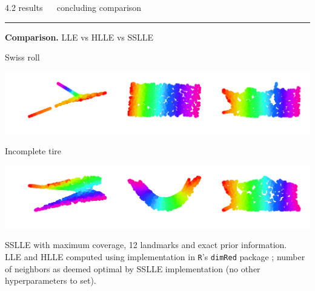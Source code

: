 \documentclass[11pt, compress, t, notes = noshow, xcolor = table, 
aspectratio = 1610]{beamer}
\begin{document}
\LARGE
\begin{frame}{\textcolor{gray!90}{4.2 results} ~~ concluding comparison}
\normalsize
\vspace{-0.5cm}
\noindent \textcolor{gray!90}{\rule{\textwidth}{1pt}}
\smallskip

\textbf{Comparison.} LLE vs HLLE vs SSLLE

\vspace{0.3cm}

\begin{minipage}[c]{0.2\textwidth}
  Swiss roll
\end{minipage}%
\begin{minipage}[c]{0.8\textwidth}
  \includegraphics[trim = 0 0 0 0, clip, %
    width = \textwidth]{figures/comparison_swiss}
\end{minipage}

\vspace{0.3cm}   

\begin{minipage}[c]{0.2\textwidth}
  Incomplete tire
\end{minipage}%
\begin{minipage}[c]{0.8\textwidth}
  \includegraphics[trim = 0 0 0 0, clip, %
    width = \textwidth]{figures/comparison_tire}
\end{minipage}


\vspace{0.3cm}  

\scriptsize
SSLLE with maximum coverage, 12 landmarks and exact prior information. \\
LLE and HLLE computed using implementation in \texttt{R}'s \texttt{dimRed} 
package \citep{pkgdimred}; number of neighbors as deemed optimal by 
SSLLE implementation (no other hyperparameters to set).

\end{frame}
\end{document}
